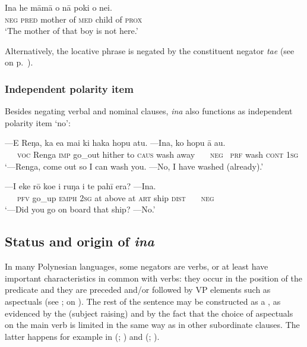 \ea\label{ex:10.110}
\gll {\ꞌ}Ina he māmā o nā poki o nei. \\
\textsc{neg} \textsc{pred} mother of \textsc{med} child of \textsc{prox} \\

\glt
‘The mother of that boy is not here.’ \textstyleExampleref{[R403.051]} 
\z

Alternatively, the locative phrase is negated by the constituent negator \textit{ta{\ꞌ}e} (see  on p.~\pageref{ex:10.143}).

\subsubsection{Independent polarity item}\label{sec:10.5.1.3}

Besides negating verbal and nominal clauses, \textit{{\ꞌ}ina} also functions as independent polarity item ‘no’:

\ea\label{ex:10.111}
\gll —E Reŋa, ka e{\ꞌ}a mai ki haka hopu atu. —{\ꞌ}Ina, ko hopu {\ꞌ}ā au. \\
~~~\textsc{voc} Renga \textsc{imp} go\_out hither to \textsc{caus} wash away ~~~\textsc{neg}~ \textsc{prf} wash \textsc{cont} \textsc{1sg} \\

\glt 
‘—Renga, come out so I can wash you. —No, I have washed (already).’ \textstyleExampleref{[Mtx-7-15.046]}
\z

\ea\label{ex:10.112}
\gll —I eke rō koe {\ꞌ}i ruŋa i te pahī era? —{\ꞌ}Ina.\\
~~~\textsc{pfv} go\_up \textsc{emph} \textsc{2sg} at above at \textsc{art} ship \textsc{dist} ~~~\textsc{neg}~~\\

\glt 
‘—Did you go on board that ship? —No.’ \textstyleExampleref{[R413.811]}\textstyleExampleref{} 
\z

\subsection{Status and origin of \textit{{\ꞌ}ina}}\label{sec:10.5.2}

In many Polynesian languages, some negators are verbs, or at least have important characteristics in common with verbs: they occur in the position of the predicate and they are preceded and/or followed by VP elements such as aspectuals (see \citealt[209–211]{Payne1985}; \citealt{Broschart1999} on ). The rest of the sentence may be constructed as a , as evidenced by the  (subject raising) and by the fact that the choice of aspectuals on the main verb is limited in the same way as in other subordinate clauses. The latter happens for example in  (\citealt{LazardPeltzer1999}; \citealt[49]{LazardPeltzer2000}) and  (\citealt{Hohepa1969Not}; \citealt[139–141]{Bauer1993}).

